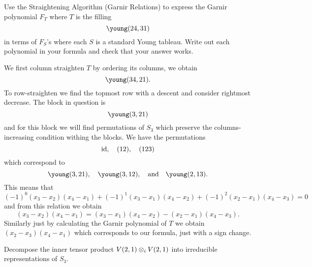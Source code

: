 \documentclass[12pt]{memoir}
\begin{document}
\begin{Ej}[Exercise 3]
    Use the Straightening Algorithm (Garnir Relations) to express the Garnir polynomial $F_T$ where $T$ is the filling 
    $$\young(24,31)$$
    in terms of $F_S$'s where each $S$ is a standard Young tableau.
    Write out each polynomial in your formula and check that your answer works.
\end{Ej}

\begin{ptcbr}
    We first column straighten $T$ by ordering its columns, we obtain
    $$\young(34,21).$$
    To row-straighten we find the topmost row with a descent and consider rightmost decrease. The block in question is 
    $$\young(3,21)$$
    and for this block we will find permutations of $S_3$ which preserve the columns-increasing condition withing the blocks. We have the permutations 
    $$\operatorname{id},\quad (12),\quad (123)$$
    which correspond to 
    $$\young(3,21),\quad \young(3,12),\word{and}\young(2,13).$$
    This means that 
    $$(-1)^0(x_3-x_2)(x_4-x_1)+(-1)^1(x_3-x_1)(x_4-x_2)+(-1)^2(x_2-x_1)(x_4-x_3)=0$$
    and from this relation we obtain 
    $$(x_3-x_2)(x_4-x_1)=(x_3-x_1)(x_4-x_2)-(x_2-x_1)(x_4-x_3).$$
    Similarly just by calculating the Garnir polynomial of $T$ we obtain $(x_2-x_3)(x_4-x_1)$ which corresponds to our formula, just with a sign change.
\end{ptcbr}

\begin{Ej}[Exercise 5]
    Decompose the inner tensor product $V(2,1)\otimes_i V(2,1)$ into irreducible representations of $S_3$.
\end{Ej}
\end{document}
